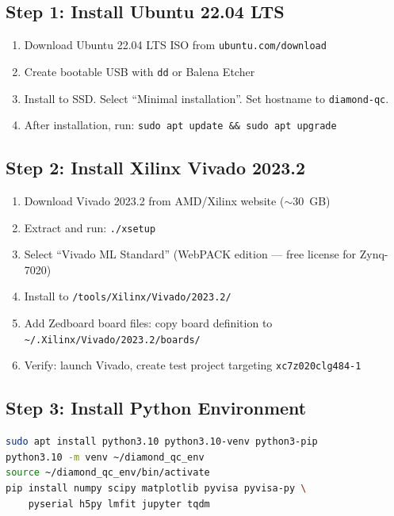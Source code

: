 \documentclass[11pt,a4paper,openany]{book}
\begin{document}
\subsection{Step 1: Install Ubuntu 22.04 LTS}

\begin{enumerate}[nosep]
  \item Download Ubuntu 22.04 LTS ISO from \texttt{ubuntu.com/download}
  \item Create bootable USB with \texttt{dd} or Balena Etcher
  \item Install to SSD. Select ``Minimal installation''. Set hostname to \texttt{diamond-qc}.
  \item After installation, run: \texttt{sudo apt update \&\& sudo apt upgrade}
\end{enumerate}

\subsection{Step 2: Install Xilinx Vivado 2023.2}

\begin{enumerate}[nosep]
  \item Download Vivado 2023.2 from AMD/Xilinx website (${\sim}30$~GB)
  \item Extract and run: \texttt{./xsetup}
  \item Select ``Vivado ML Standard'' (WebPACK edition --- free license for Zynq-7020)
  \item Install to \texttt{/tools/Xilinx/Vivado/2023.2/}
  \item Add Zedboard board files: copy board definition to\\
        \texttt{\textasciitilde/.Xilinx/Vivado/2023.2/boards/}
  \item Verify: launch Vivado, create test project targeting \texttt{xc7z020clg484-1}
\end{enumerate}

\subsection{Step 3: Install Python Environment}

\begin{lstlisting}[language=bash,numbers=none]
sudo apt install python3.10 python3.10-venv python3-pip
python3.10 -m venv ~/diamond_qc_env
source ~/diamond_qc_env/bin/activate
pip install numpy scipy matplotlib pyvisa pyvisa-py \
    pyserial h5py lmfit jupyter tqdm
\end{lstlisting}
\end{document}
